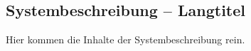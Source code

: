 \begin{showSystem}%
%
\chapter[Systembeschreibung -- Kurztitel für Inhaltsverzeichnis und Kolumnentitel]{Systembeschreibung -- Langtitel}%
\label{chap:SystemDescription}
%
Hier kommen die Inhalte der Systembeschreibung rein.
%

%
\end{showSystem}%

